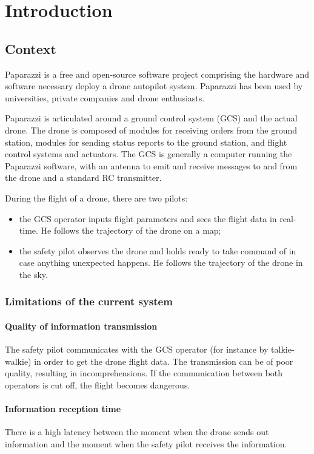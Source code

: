 \documentclass[conference]{IEEEtran}
\begin{document}
\section{Introduction}
\subsection{Context}
Paparazzi is a free and open-source software project \cite{Paparazzi} comprising the hardware and software necessary deploy a drone autopilot system. Paparazzi has been used by universities, private companies and drone enthusiasts. 

Paparazzi is articulated around a ground control system (GCS) and the actual drone. The drone is composed of modules for receiving orders from the ground station, modules for sending status reports to the ground station, and flight control systems and actuators. The GCS is generally a computer running the Paparazzi software, with an antenna to emit and receive messages to and from the drone and a standard RC transmitter. 

During the flight of a drone, there are two pilots:
\begin{itemize}
\item the GCS operator inputs flight parameters and sees the flight data in real-time. He follows the trajectory of the drone on a map;
\item the safety pilot observes the drone and holds ready to take command of in case anything unexpected happens. He follows the trajectory of the drone in the sky. 
\end{itemize}

\subsubsection{Limitations of the current system} 
\paragraph{Quality of information transmission} The safety pilot communicates with the GCS operator (for instance by talkie-walkie) in order to get the drone flight data. The transmission can be of poor quality, resulting in incomprehensions. If the communication between both operators is cut off, the flight becomes dangerous.

\paragraph{Information reception time} There is a high latency between the moment when the drone sends out information and the moment when the safety pilot receives the information.
\end{document}
